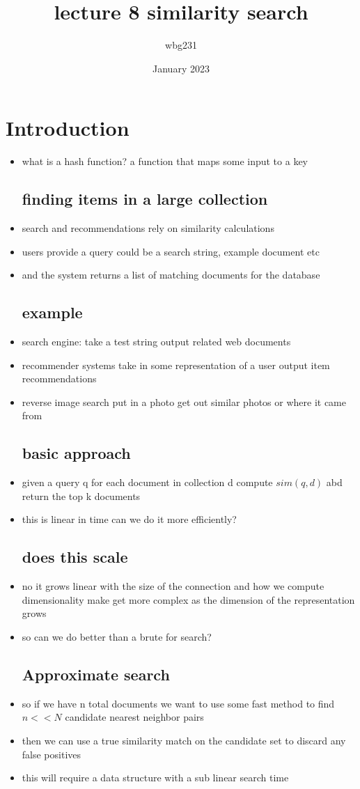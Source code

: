 \documentclass{article}
\title{lecture 8 similarity search }
\author{wbg231 }
\date{January 2023}
\begin{document}
\maketitle

\section{Introduction}
\begin{itemize}
\item what is a hash function? a function that maps some input to a key 
\subsection*{finding items in a large collection }
\item search and recommendations rely on similarity calculations 
\item users provide a query could be a search string, example document etc
\item and the system returns a list of matching documents for the database
\subsection*{example}
\item search engine: take a test string output related web documents
\item recommender systems take in some representation of a user output item recommendations
\item reverse image search put in a photo get out similar photos or where it came from 
\subsection*{basic approach}
\item given a query q for each document in collection d compute $sim(q,d)$ abd return the top k documents
\item this is linear in time can we do it more efficiently?
\subsection*{does this scale}
\item no it grows linear with the size of the connection and how we compute dimensionality make get more complex as the dimension of the representation grows 
\item so can we do better than a brute for search?
\subsection*{Approximate search}
\item so if we have n total documents we want to use some fast method to find $n<<N$ candidate nearest neighbor pairs
\item then we can use a true similarity match on the candidate set to discard any false positives
\item this will require a data structure with a sub linear search time 

\end{itemize}
\end{document}
